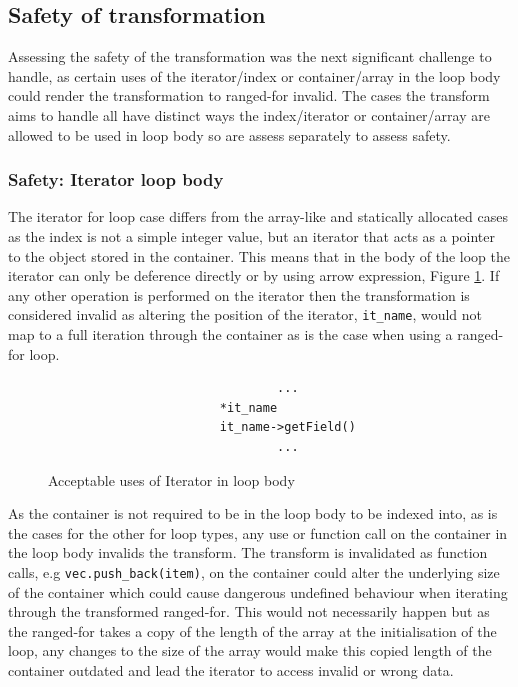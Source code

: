 \documentclass[bsc,frontabs,singlespacing,twoside,parskip,deptreport]{infthesis}
\begin{document}


\subsection{Safety of transformation}\label{sec:safety-of-trans}
Assessing the safety of the transformation was the next significant challenge to handle, as certain uses of the iterator/index or container/array in the loop body could render the transformation to ranged-for invalid. The cases the transform aims to handle all have distinct ways the index/iterator or container/array are allowed to be used in loop body so are assess separately to assess safety.

\subsubsection{Safety: Iterator loop body}\label{sec:safe-iter}
The iterator for loop case differs from the array-like and statically allocated cases as the index is not a simple integer value, but an iterator that acts as a pointer to the object stored in the container. This means that in the body of the loop the iterator can only be deference directly or by using arrow expression, Figure \ref{fig:code-iter-uses}. If any other operation is performed on the iterator then the transformation is considered invalid as altering the position of the iterator, \texttt{it\_name}, would not map to a full iteration through the container as is the case when using a ranged-for loop. 

\begin{figure}[h]
    \centering
    \begin{verbatim}
                                ...
                        *it_name
                        it_name->getField()
                                ...
    \end{verbatim}
    \caption{Acceptable uses of Iterator in loop body}
    \label{fig:code-iter-uses}
\end{figure}

As the container is not required to be in the loop body to be indexed into, as is the cases for the other for loop types, any use or function call on the container in the loop body invalids the transform. The transform is invalidated as function calls, e.g \texttt{vec.push\_back(item)}, on the container could alter the underlying size of the container which could cause dangerous undefined behaviour when iterating through the transformed ranged-for. This would not necessarily happen but as the ranged-for takes a copy of the length of the array at the initialisation of the loop, any changes to the size of the array would make this copied length of the container outdated and lead the iterator to access invalid or wrong data. 
\end{document}
